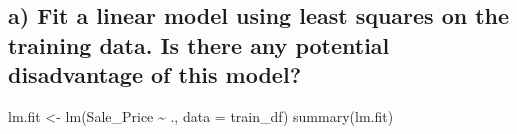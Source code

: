 \documentclass[
]{article}
\newenvironment{Shaded}{\begin{snugshade}}{\end{snugshade}}
\newcommand{\AttributeTok}[1]{\textcolor[rgb]{0.77,0.63,0.00}{#1}}
\newcommand{\CommentTok}[1]{\textcolor[rgb]{0.56,0.35,0.01}{\textit{#1}}}
\newcommand{\DecValTok}[1]{\textcolor[rgb]{0.00,0.00,0.81}{#1}}
\newcommand{\FunctionTok}[1]{\textcolor[rgb]{0.00,0.00,0.00}{#1}}
\newcommand{\NormalTok}[1]{#1}
\newcommand{\OtherTok}[1]{\textcolor[rgb]{0.56,0.35,0.01}{#1}}
\newcommand{\SpecialCharTok}[1]{\textcolor[rgb]{0.00,0.00,0.00}{#1}}
\newcommand{\StringTok}[1]{\textcolor[rgb]{0.31,0.60,0.02}{#1}}
\begin{document}
\begin{Shaded}
\end{Shaded}

\hypertarget{a-fit-a-linear-model-using-least-squares-on-the-training-data.-is-there-any-potential-disadvantage-of-this-model}{%
\subsection{a) Fit a linear model using least squares on the training
data. Is there any potential disadvantage of this
model?}\label{a-fit-a-linear-model-using-least-squares-on-the-training-data.-is-there-any-potential-disadvantage-of-this-model}}

\begin{Shaded}
\begin{Highlighting}[]
\NormalTok{lm.fit }\OtherTok{\textless{}{-}} \FunctionTok{lm}\NormalTok{(Sale\_Price }\SpecialCharTok{\textasciitilde{}}\NormalTok{ ., }\AttributeTok{data =}\NormalTok{ train\_df)}
\FunctionTok{summary}\NormalTok{(lm.fit)}
\end{Highlighting}
\end{Shaded}
\end{document}
